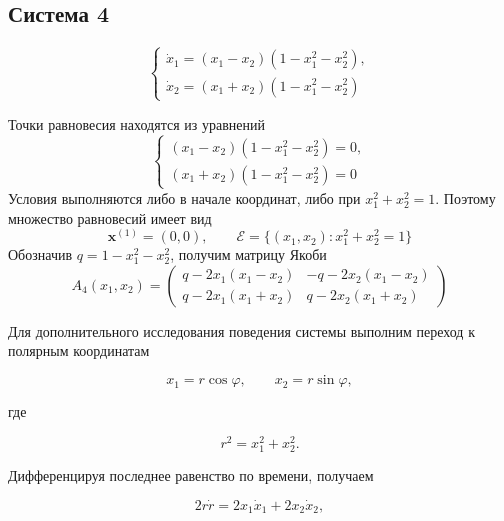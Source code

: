 
\subsection{Система 4}

\begin{equation}
  \begin{cases}
    \dot x_1=(x_1-x_2)(1-x_1^2-x_2^2),\\
    \dot x_2=(x_1+x_2)(1-x_1^2-x_2^2)
  \end{cases}
  \label{eq:system-4}
\end{equation}

Точки равновесия находятся из уравнений
\begin{equation}
  \begin{cases}
    (x_1-x_2)(1-x_1^2-x_2^2)=0,\\
    (x_1+x_2)(1-x_1^2-x_2^2)=0
  \end{cases}
\end{equation}
Условия выполняются либо в начале координат, либо при
$x_1^2+x_2^2=1$. Поэтому множество равновесий имеет вид
\begin{equation}
  \bm x^{(1)}=(0,0),\qquad
  \mathcal E=\{(x_1,x_2):x_1^2+x_2^2=1\}
\end{equation}
Обозначив $q=1-x_1^2-x_2^2$, получим матрицу Якоби
\begin{equation}
  A_4(x_1,x_2)=
  \begin{pmatrix}
    q-2x_1(x_1-x_2) & -q-2x_2(x_1-x_2)\\
    q-2x_1(x_1+x_2) & q-2x_2(x_1+x_2)
  \end{pmatrix}
\end{equation}

Для дополнительного исследования поведения системы выполним переход
к полярным координатам

\begin{equation}
  x_1=r\cos\varphi,\qquad x_2=r\sin\varphi,
\end{equation}

где

\begin{equation}
  r^2=x_1^2+x_2^2.
\end{equation}

Дифференцируя последнее равенство по времени, получаем

\begin{equation}
  2r\dot r=2x_1\dot x_1+2x_2\dot x_2,
\end{equation}

